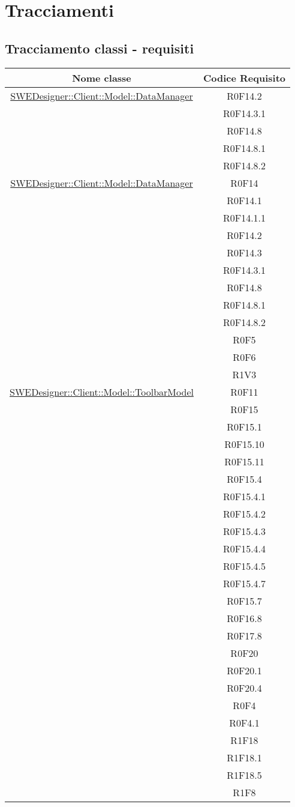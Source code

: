 \documentclass[../DefinizioneDiProdotto.tex]{subfiles}
\begin{document}
	\section{Tracciamenti}
		\subsection{Tracciamento classi - requisiti}
			\normalsize
			\begin{longtable}{|c|c|}
				\hline
				\textbf{Nome classe} & \textbf{Codice Requisito} \\
				\hline
				\endhead
				\hyperlink{SWEDesigner::Client::Model::DataManager}{SWEDesigner::Client::Model::DataManager}
				& R0F14.2\\
				& R0F14.3.1\\
				& R0F14.8\\
				& R0F14.8.1\\
				& R0F14.8.2\\
				\hline

				\hyperlink{SWEDesigner::Client::Model::DataManager}{SWEDesigner::Client::Model::DataManager}
				& R0F14\\
				& R0F14.1\\
				& R0F14.1.1\\
				& R0F14.2\\
				& R0F14.3\\
				& R0F14.3.1\\
				& R0F14.8\\
				& R0F14.8.1\\
				& R0F14.8.2\\
				& R0F5\\
				& R0F6\\
				& R1V3\\
				\hline

				\hyperlink{SWEDesigner::Client::Model::ToolbarModel}{SWEDesigner::Client::Model::ToolbarModel}
				& R0F11\\
				& R0F15\\
				& R0F15.1\\
				& R0F15.10\\
				& R0F15.11\\
				& R0F15.4\\
				& R0F15.4.1\\
				& R0F15.4.2\\
				& R0F15.4.3\\
				& R0F15.4.4\\
				& R0F15.4.5\\
				& R0F15.4.7\\
				& R0F15.7\\
				& R0F16.8\\
				& R0F17.8\\
				& R0F20\\
				& R0F20.1\\
				& R0F20.4\\
				& R0F4\\
				& R0F4.1\\
				& R1F18\\
				& R1F18.1\\
				& R1F18.5\\
				& R1F8\\
				\hline


\end{longtable}
\end{document}
